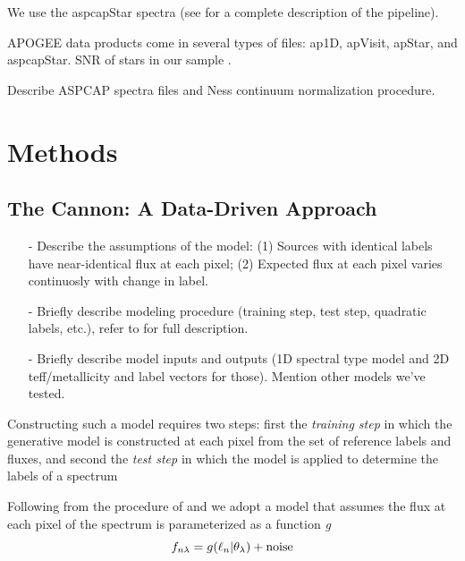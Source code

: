 \documentclass[modern]{aastex62}
\begin{document}
We use the aspcapStar spectra (see \citealt{Perez:2016} for a complete description of the pipeline).

APOGEE data products come in several types of files: ap1D, apVisit, apStar, and aspcapStar. SNR of stars in our sample .

Describe ASPCAP spectra files and Ness continuum normalization procedure.


\section{Methods} \label{sec:cannon}

\subsection{The Cannon: A Data-Driven Approach}

\begin{enumerate}
\item[-] Describe the assumptions of the model: (1) Sources with identical labels have near-identical flux at each pixel; (2) Expected flux at each pixel varies continuosly with change in label. 
\item[-] Briefly describe modeling procedure (training step, test step, quadratic labels, etc.), refer to \citealt{Ness:2015} for full description.
\item[-] Briefly describe model inputs and outputs (1D spectral type model and 2D teff/metallicity and label vectors for those). Mention other models we've tested.
\end{enumerate}

Constructing such a model requires two steps: first the \emph{training step} in which the generative model is constructed at each pixel from the set of reference labels and fluxes, and second the \emph{test step} in which the model is applied to determine the labels of a spectrum 


Following from the procedure of \citealt{Ness:2015} and \citealt{Ho:2017a} we adopt a model that assumes the flux at each pixel of the spectrum is parameterized as a function \textit{g} 
\begin{equation}
	f_{n\lambda} = g(\ell_n | \theta_{\lambda}) + {\rm noise}
\end{equation}
\end{document}
